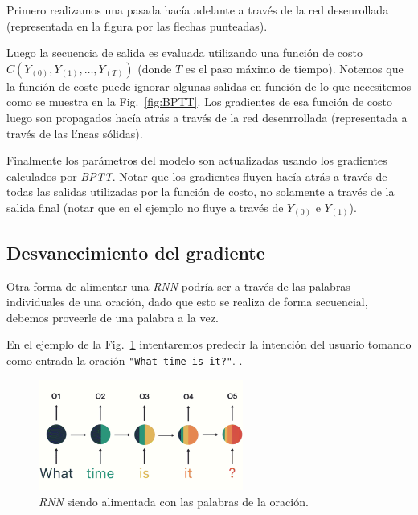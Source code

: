 \documentclass[a4paper,12pt]{article}
\begin{document}
Primero realizamos una pasada hacía adelante a través de la red desenrollada (representada en la figura por las flechas punteadas). 

Luego la secuencia de salida es evaluada utilizando una función de costo $C(Y_{(0)}, Y_{(1)}, \dots, Y_{(T)})$ (donde $T$ es el paso máximo de tiempo). Notemos que la función de coste puede ignorar algunas salidas en función de lo que necesitemos como se muestra en la Fig.~\ref{fig:BPTT}.
Los gradientes de esa función de costo luego son propagados hacía atrás a través de la red desenrrollada (representada a través de las líneas sólidas).

Finalmente los parámetros del modelo son actualizadas usando los gradientes calculados por \textit{BPTT}. Notar que los gradientes fluyen hacía atrás a través de todas las salidas utilizadas por la función de costo, no solamente a través de la salida final (notar que en el ejemplo no fluye a través de $Y_{(0)}$ e $Y_{(1)}$).

\subsection{Desvanecimiento del gradiente}

Otra forma de alimentar una \textit{RNN} podría ser a través de las palabras individuales de una oración, dado que esto se realiza de forma secuencial, debemos proveerle de una palabra a la vez.

En el ejemplo de la Fig.~\ref{fig:rnnvanishing1} intentaremos predecir la intención del usuario tomando como entrada la oración \texttt{"What time is it?"}. \citep{phi:rnn}.

\begin{figure}[H]
	\begin{center}				
	\includegraphics[width=0.6\textwidth]{vanishing1.png}
  	\caption{\textit{RNN} siendo alimentada con las palabras de la oración.}
  	\label{fig:rnnvanishing1}
  	\end{center}
\end{figure}
\end{document}
